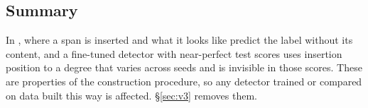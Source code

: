\begin{table}[t]
\centering
\resizebox{\textwidth}{!}{}
\caption{\vtwo{} test by row group: recall on injected rows, flag rates on benign-imperative rows, raw documents
and their whitespace-collapsed version (P4), and the paired P4 $-$ raw clean difference. Default thresholds.}
\label{tab:test-groups}
\end{table}

\subsection{Summary}
In \vtwo{}, where a span is inserted and what it looks like predict the label without its content, and a
fine-tuned detector with near-perfect test scores uses insertion position to a degree that varies across seeds and
is invisible in those scores. These are properties of the construction procedure, so any detector trained or
compared on data built this way is affected. \S\ref{sec:v3} removes them.
